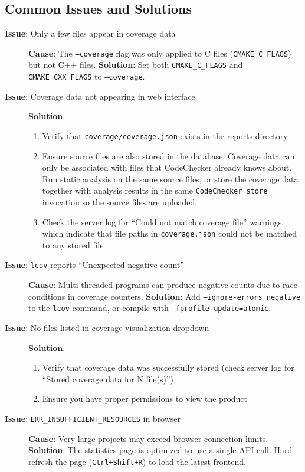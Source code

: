 \subsection{Common Issues and Solutions}

\begin{description}
    \item[\textbf{Issue}: Only a few files appear in coverage data]
    \textbf{Cause}: The \texttt{--coverage} flag was only applied to C files (\texttt{CMAKE\_C\_FLAGS}) but not C++ files.
    \textbf{Solution}: Set both \texttt{CMAKE\_C\_FLAGS} and \texttt{CMAKE\_CXX\_FLAGS} to \texttt{--coverage}.
    
    \item[\textbf{Issue}: Coverage data not appearing in web interface]
    \textbf{Solution}: 
    \begin{enumerate}
        \item Verify that \texttt{coverage/coverage.json} exists in the reports directory
        \item Ensure source files are also stored in the database. Coverage data can only be associated with files that CodeChecker already knows about. Run static analysis on the same source files, or store the coverage data together with analysis results in the same \texttt{CodeChecker store} invocation so the source files are uploaded.
        \item Check the server log for ``Could not match coverage file'' warnings, which indicate that file paths in \texttt{coverage.json} could not be matched to any stored file
    \end{enumerate}
    
    \item[\textbf{Issue}: \texttt{lcov} reports ``Unexpected negative count'']
    \textbf{Cause}: Multi-threaded programs can produce negative counts due to race conditions in coverage counters.
    \textbf{Solution}: Add \texttt{--ignore-errors negative} to the \texttt{lcov} command, or compile with \texttt{-fprofile-update=atomic}.
    
    \item[\textbf{Issue}: No files listed in coverage visualization dropdown]
    \textbf{Solution}: 
    \begin{enumerate}
        \item Verify that coverage data was successfully stored (check server log for ``Stored coverage data for N file(s)'')
        \item Ensure you have proper permissions to view the product
    \end{enumerate}
    
    \item[\textbf{Issue}: \texttt{ERR\_INSUFFICIENT\_RESOURCES} in browser]
    \textbf{Cause}: Very large projects may exceed browser connection limits.
    \textbf{Solution}: The statistics page is optimized to use a single API call. Hard-refresh the page (\texttt{Ctrl+Shift+R}) to load the latest frontend.
\end{description}

